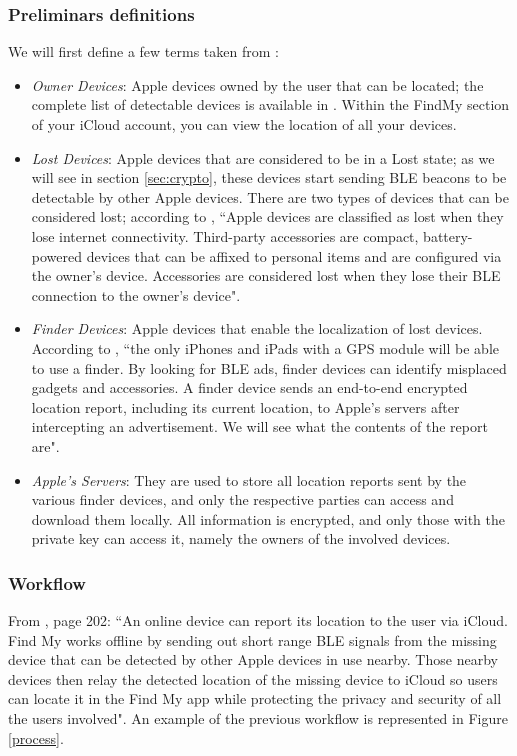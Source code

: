 \documentclass[english]{article}
\begin{document}
\subsubsection{Preliminars definitions}
We will first define a few terms taken from \cite{whocanfind}:
\begin{itemize}
  \item \textit{Owner Devices}: Apple devices owned by the user that can be located; the complete list of detectable devices is available in \cite{Apple}. Within the FindMy section of your iCloud account, you can view the location of all your devices.
  \item \textit{Lost Devices}: Apple devices that are considered to be in a Lost state; as we will see in section \ref{sec:crypto}, these devices start sending BLE beacons to be detectable by other Apple devices. There are two types of devices that can be considered lost; according to \cite{whocanfind}, ``Apple devices are classified as lost when they lose internet connectivity. Third-party accessories \cite{gadget} are compact, battery-powered devices that can be affixed to personal items and are configured via the owner's device. Accessories are considered lost when they lose their BLE connection to the owner's device".
  \item \textit{Finder Devices}: Apple devices that enable the localization of lost devices. According to \cite{whocanfind}, ``the only iPhones and iPads with a GPS module will be able to use a finder. By looking for BLE ads, finder devices can identify misplaced gadgets and accessories. A finder device sends an end-to-end encrypted location report, including its current location, to Apple's servers after intercepting an advertisement. We will see what the contents of the report are".
  \item \textit{Apple’s Servers}: They are used to store all location reports sent by the various finder devices, and only the respective parties can access and download them locally. All information is encrypted, and only those with the private key can access it, namely the owners of the involved devices.
\end{itemize}
\subsubsection{Workflow}
From \cite{aps}, page 202: ``An online device can report its location to the user via iCloud. Find My works offline by sending out short range BLE signals from the missing device that can be detected by other Apple devices in use nearby. Those nearby devices then relay the detected location of the missing device to iCloud so users can locate it in the Find My app while protecting the privacy and security of all the users involved". An example of the previous workflow is represented in Figure \ref{process}.
\end{document}
